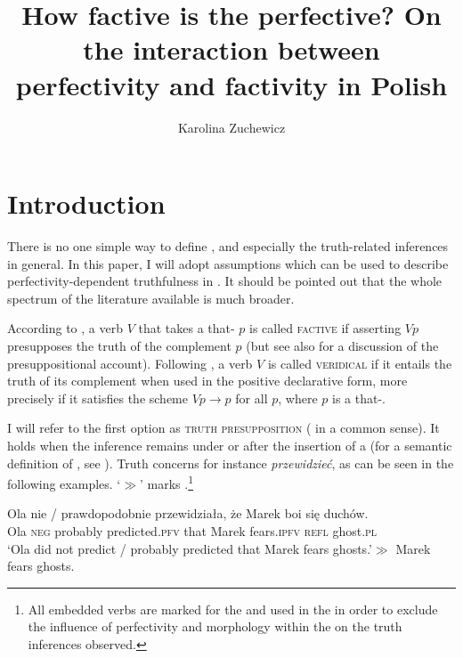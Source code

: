 \documentclass[output=paper,  modfonts,  newtxmath,  hidelinks		  ]{langscibook}
\title{How factive is the perfective? \newlineCover On the interaction between perfectivity and factivity in Polish}
\author{Karolina Zuchewicz\affiliation{Leibniz-Zentrum Allgemeine Sprachwissenschaft \&\\Humboldt-Universität zu Berlin}}
\begin{document}
\maketitle
{}

\section{Introduction}\label{21:intro}

There is no one simple way to define , and especially the truth-related inferences in general. In this paper, I will adopt assumptions which can be used to describe perfectivity-dependent truthfulness in . It should be pointed out that the whole spectrum of the literature available is much broader.

According to \cite{KiparskyKiparsky1970}, a verb $V$ that takes a that- $p$ is called \textsc{factive} if asserting $\mathit{V\!p}$ presupposes the truth of the complement $p$ (but see also \citealt{Karttunen1971} for a discussion of the presuppositional account). Following \citet[101]{Egré2008}, a verb $V$ is called \textsc{veridical} if it entails the truth of its complement when used in the positive declarative form, more precisely if it satisfies the scheme $\mathit{V\!p}{}\rightarrow{}p$ for all $p$, where $p$ is a that-.

I will refer to the first option as \textsc{truth presupposition} ( in a common sense). It holds when the inference remains under  or after the insertion of a  (for a semantic definition of , see \citealt{Strawson1950}). Truth  concerns for instance  \textit{przewidzieć}, as can be seen in the following examples. ‘$\gg$’ marks .\footnote{All embedded verbs are marked for the  and used in the  in order to exclude the influence of perfectivity and  morphology within the  on the truth inferences observed.}

\ea\label{21:1} 
\gll Ola nie / prawdopodobnie przewidziała, że Marek boi się duchów.\\
    Ola \textsc{neg} {} probably predicted.\textsc{pfv} that Marek fears.\textsc{ipfv} \textsc{refl} ghost.\textsc{pl}\\
\glt	 `Ola did not predict / probably predicted that Marek fears ghosts.'\newline$\gg$ Marek fears ghosts.
\z
\end{document}
